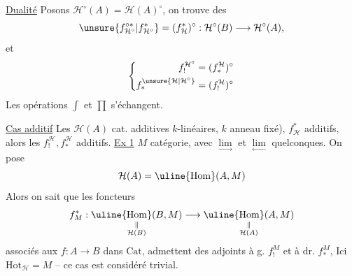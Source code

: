 \uline{Dualité} Posons $\mathcal H^{\circ}(A)=\mathcal H(A)^{\circ}$, on trouve
des
\[
\unsure{f_{\mathcal H^{\circ}}^{\circ *}|f_{\mathcal H^{\circ}}^{*}}
=(f_{\mathcal H}^{*})^{\circ}:\mathcal H^{\circ}(B)\longrightarrow\mathcal H^{\circ}(A),
\]
et
\[
\left\{\begin{aligned}
f_!^{\mathcal H^{\circ}}&=(f_*^{\mathcal H})^{\circ}\\
f_*^{\unsure{\mathcal H|\mathcal H^{\circ}}}&=(f_!^{\mathcal H})^{\circ}
\end{aligned}\right.
\]
Les opérations $\int$ et $\prod$ s'échangent.

\uline{Cas additif} Les $\mathcal H(A)$  cat. additives
 $k$-linéaires, $k$ anneau fixé), $f_{\mathcal H}^{*}$
additifs, alors les $f_!^{\mathcal H},f_*^{\mathcal H}$ additifs.
\uline{Ex 1} $M$ catégorie, avec $\underset{\longrightarrow}{\lim}$ et $\underset{\longleftarrow}{\lim}$
quelconques. On pose
\[
\mathcal H(A)=\uline{\operatorname{Hom}}(A,M)
\]
Alors on sait que les foncteurs
\[
f_M^{*}:\underset{\substack{\Vert\\\mathcal H(B)}}{\uline{\operatorname{Hom}}(B,M)}
\longrightarrow
\underset{\substack{\Vert\\\mathcal H(A)}}{\uline{\operatorname{Hom}}(A,M)}
\]
associés aux $f:A\longrightarrow B$ dans $\mathrm{Cat}$, admettent
des adjoints à g. $f_!^M$ et à dr. $f_*^M$,
Ici $\mathrm{Hot}_{\mathcal H}=M$ -- ce cas est
considéré trivial.

